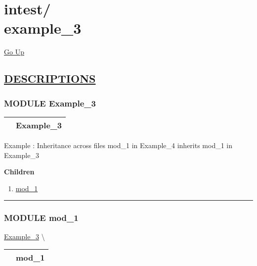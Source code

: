 \chapter*{\color{headfile}
{\large intest\slash\hspace{0pt}}
 \\
example_3
}
\hypertarget{ecldoc:toc:intest.example_3}{}
\hyperlink{ecldoc:toc:root/intest}{Go Up}


\section*{\underline{\textsf{DESCRIPTIONS}}}
\subsection*{\textsf{\colorbox{headtoc}{\color{white} MODULE}
Example\_3}}

\hypertarget{ecldoc:intest.Example_3}{}

{\renewcommand{\arraystretch}{1.5}
\begin{tabularx}{\textwidth}{|>{\raggedright\arraybackslash}l|X|}
\hline
\hspace{0pt}\mytexttt{\color{red} } & \textbf{Example\_3} \\
\hline
\end{tabularx}
}

\par
Example : Inheritance across files mod\_1 in Example\_4 inherits mod\_1 in Example\_3


\textbf{Children}
\begin{enumerate}
\item \hyperlink{ecldoc:intest.Example_3.mod_1}{mod\_1}
\end{enumerate}

\rule{\linewidth}{0.5pt}

\subsection*{\textsf{\colorbox{headtoc}{\color{white} MODULE}
mod\_1}}

\hypertarget{ecldoc:intest.Example_3.mod_1}{}
\hspace{0pt} \hyperlink{ecldoc:intest.Example_3}{Example_3} \textbackslash 

{\renewcommand{\arraystretch}{1.5}
\begin{tabularx}{\textwidth}{|>{\raggedright\arraybackslash}l|X|}
\hline
\hspace{0pt}\mytexttt{\color{red} } & \textbf{mod\_1} \\
\hline
\end{tabularx}
}

